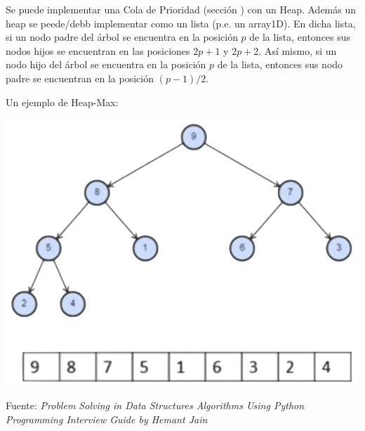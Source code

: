 Se puede implementar una Cola de Prioridad (sección \label{sec:ColaPrioridad}) con un Heap.
Además un heap se peede/debb implementar como un lista (p.e. un array1D). 
En dicha lista, si un nodo padre del árbol se encuentra en la posición $p$ de la lista, entonces sus nodos hijos se encuentran en las posiciones $2p+1$ y $2p+2$.
Así mismo, si  un nodo hijo del árbol se encuentra en la posición $p$ de la lista,  entonces sus nodo padre se encuentran en la posición $(p-1)/2$.

\begin{ejemplo}
Un ejemplo de Heap-Max:

\centerline{\includegraphics[width=.43\textwidth]{input/06-Graph-fig/heapSort}}

Fuente: \textit{Problem Solving in Data Structures  Algorithms Using Python Programming Interview Guide by Hemant Jain}
\end{ejemplo}



